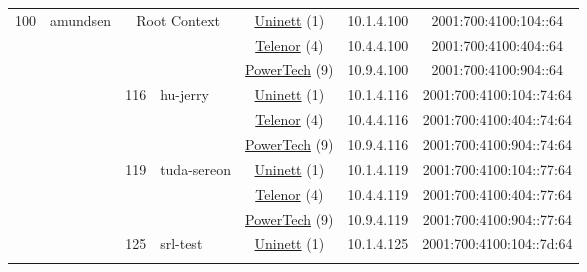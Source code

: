 \begin{small}
\begin{center}
\begin{longtable}{|c|c|c|c|c|c|c|c|}
 \multirow{51}{*}{\tiny{100}} & \multicolumn{1}{|l|}{\multirow{51}{*}{\tiny{amundsen}}} & \multicolumn{2}{|c|}{\multirow{3}{*}{\tiny{Root Context}}} & \multicolumn{2}{|c|}{\tiny{\href{https://www.uninett.no}{Uninett} (1)}} & \tiny{10.1.4.100} & \tiny{2001:700:4100:104::64} \\* \cline{5-5}\cline{6-6}\cline{7-7}\cline{8-8}
  &  & \multicolumn{2}{|c|}{} & \multicolumn{2}{|c|}{\tiny{\href{https://www.telenor.no}{Telenor} (4)}} & \tiny{10.4.4.100} & \tiny{2001:700:4100:404::64} \\* \cline{5-5}\cline{6-6}\cline{7-7}\cline{8-8}
  &  & \multicolumn{2}{|c|}{} & \multicolumn{2}{|c|}{\tiny{\href{http://www.powertech.no}{PowerTech} (9)}} & \tiny{10.9.4.100} & \tiny{2001:700:4100:904::64} \\* \cline{3-3}\cline{4-4}\cline{5-5}\cline{6-6}\cline{7-7}\cline{8-8}
  &  & \multirow{3}{*}{\tiny{116}} & \multicolumn{1}{|l|}{\multirow{3}{*}{\tiny{hu-jerry}}} & \multicolumn{2}{|c|}{\tiny{\href{https://www.uninett.no}{Uninett} (1)}} & \tiny{10.1.4.116} & \tiny{2001:700:4100:104::74:64} \\* \cline{5-5}\cline{6-6}\cline{7-7}\cline{8-8}
  &  &  &  & \multicolumn{2}{|c|}{\tiny{\href{https://www.telenor.no}{Telenor} (4)}} & \tiny{10.4.4.116} & \tiny{2001:700:4100:404::74:64} \\* \cline{5-5}\cline{6-6}\cline{7-7}\cline{8-8}
  &  &  &  & \multicolumn{2}{|c|}{\tiny{\href{http://www.powertech.no}{PowerTech} (9)}} & \tiny{10.9.4.116} & \tiny{2001:700:4100:904::74:64} \\* \cline{3-3}\cline{4-4}\cline{5-5}\cline{6-6}\cline{7-7}\cline{8-8}
  &  & \multirow{3}{*}{\tiny{119}} & \multicolumn{1}{|l|}{\multirow{3}{*}{\tiny{tuda-sereon}}} & \multicolumn{2}{|c|}{\tiny{\href{https://www.uninett.no}{Uninett} (1)}} & \tiny{10.1.4.119} & \tiny{2001:700:4100:104::77:64} \\* \cline{5-5}\cline{6-6}\cline{7-7}\cline{8-8}
  &  &  &  & \multicolumn{2}{|c|}{\tiny{\href{https://www.telenor.no}{Telenor} (4)}} & \tiny{10.4.4.119} & \tiny{2001:700:4100:404::77:64} \\* \cline{5-5}\cline{6-6}\cline{7-7}\cline{8-8}
  &  &  &  & \multicolumn{2}{|c|}{\tiny{\href{http://www.powertech.no}{PowerTech} (9)}} & \tiny{10.9.4.119} & \tiny{2001:700:4100:904::77:64} \\* \cline{3-3}\cline{4-4}\cline{5-5}\cline{6-6}\cline{7-7}\cline{8-8}
  &  & \multirow{3}{*}{\tiny{125}} & \multicolumn{1}{|l|}{\multirow{3}{*}{\tiny{srl-test}}} & \multicolumn{2}{|c|}{\tiny{\href{https://www.uninett.no}{Uninett} (1)}} & \tiny{10.1.4.125} & \tiny{2001:700:4100:104::7d:64} \\* \cline{5-5}\cline{6-6}\cline{7-7}\cline{8-8}

\end{longtable}
\end{center}
\end{small}
